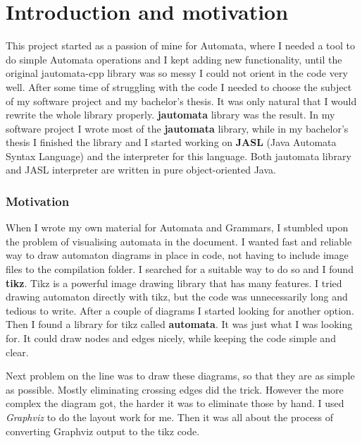 \documentclass{ctuthesis}
\begin{document}
\maketitle

\chapter{Introduction and motivation}
This project started as a passion of mine for Automata, where I needed a tool to do simple Automata operations and I kept adding new functionality, until the original jautomata-cpp library was so messy I could not orient in the code very well. After some time of struggling with the code I needed to choose the subject of my software project and my bachelor's thesis. It was only natural that I would rewrite the whole library properly. \textbf{jautomata} library was the result. In my software project I wrote most of the \textbf{jautomata} library, while in my bachelor's thesis I finished the library and I started working on \textbf{JASL} (Java Automata Syntax Language) and the interpreter for this language. Both jautomata library and JASL interpreter are written in pure object-oriented Java. 

\subsection{Motivation}

When I wrote my own material for Automata and Grammars, I stumbled upon the problem of visualising automata in the document. I wanted fast and reliable way to draw automaton diagrams in place in code, not having to include image files to the compilation folder. I searched for a suitable way to do so and I found \textbf{tikz}. Tikz is a powerful image drawing library that has many features. I tried drawing automaton directly with tikz, but the code was unnecessarily long and tedious to write. After a couple of diagrams I started looking for another option. Then I found a library for tikz called \textbf{automata}. It was just what I was looking for. It could draw nodes and edges nicely, while keeping the code simple and clear. 

Next problem on the line was to draw these diagrams, so that they are as simple as possible. Mostly eliminating crossing edges did the trick. However the more complex the diagram got, the harder it was to eliminate those by hand. I used \textit{Graphviz} to do the layout work for me. Then it was all about the process of converting Graphviz output to the tikz code.
\end{document}
